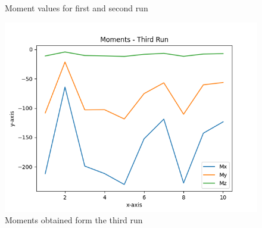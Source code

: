 \begin{figure}[!htb]%
	\centering
	\qquad
	\caption[Moment values for first and second run]{Moment values for first and second run}%
	\label{fig:result1}%
\end{figure}
\begin{center}
	\begin{figure}[H]
		\centering
		\includegraphics[width=0.7\linewidth]{Figures/Moments third run.png}
		\caption[Moments from Third run]{Moments obtained form the third run}
		\label{fig:pcb_fab}
	\end{figure}
\end{center}
